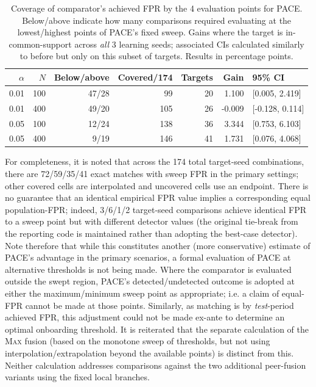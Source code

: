 \begin{table}[!htbp] 
\centering\small 
\caption{Coverage of comparator's achieved FPR by the 4 evaluation points for PACE. Below/above indicate how many comparisons required evaluating at the lowest/highest points of PACE's fixed sweep. Gains where the target is in-common-support across \emph{all} 3 learning seeds; associated CIs calculated similarly to before but only on this subset of targets. Results in percentage points.} 
\label{tab:support} 
\begin{tabular}{rrrrrrl} 
\toprule 
$\alpha$ & $N$ & Below/above & Covered/174 & Targets & Gain & 95\% CI\\
\midrule 
0.01 & 100 & 47/28 & 99 & 20 & 1.100 & [0.005, 2.419]\\
0.01 & 400 & 49/20 & 105 & 26 & -0.009 & [-0.128, 0.114]\\
0.05 & 100 & 12/24 & 138 & 36 & 3.344 & [0.753, 6.103]\\
0.05 & 400 & 9/19 & 146 & 41 & 1.731 & [0.076, 4.068]\\
\bottomrule 
\end{tabular} 
\end{table} 

For completeness, it is noted that across the 174 total target-seed combinations, there are 72/59/35/41 exact matches with sweep FPR in the primary settings; other covered cells are interpolated and uncovered cells use an endpoint. There is no guarantee that an identical empirical FPR value implies a corresponding equal population-FPR; indeed, 3/6/1/2 target-seed comparisons achieve identical FPR to a sweep point but with different detector values (the original tie-break from the reporting code is maintained rather than adopting the best-case detector). Note therefore that while this constitutes another (more conservative) estimate of PACE's advantage in the primary scenarios, a formal evaluation of PACE at alternative thresholds is not being made. Where the comparator is evaluated outside the swept region, PACE's detected/undetected outcome is adopted at either the maximum/minimum sweep point as appropriate; i.e.  a claim of equal-FPR cannot be made at those points. Similarly, as matching is by \emph{test}-period achieved FPR, this adjustment could not be made ex-ante to determine an optimal onboarding threshold. It is reiterated that the separate calculation of the \textsc{Max} fusion (based on the monotone sweep of thresholds, but not using interpolation/extrapolation beyond the available points) is distinct from this. Neither calculation addresses comparisons against the two additional peer-fusion variants using the fixed local branches.

